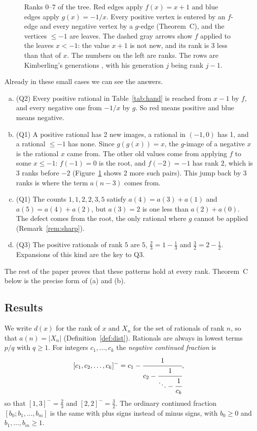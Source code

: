 \documentclass[11pt]{article}
\theoremstyle{definition}
\theoremstyle{remark}
\newcommand{\hj}[1]{[#1]^{-}}                 %
\begin{document}
\begin{figure}[t]
\centering
\resizebox{0.88\textwidth}{!}{}
\caption{Ranks $0$--$7$ of the tree. \textcolor{fred}{Red} edges apply $f(x)=x+1$ and
\textcolor{gblue}{blue} edges apply $g(x)=-1/x$. Every positive vertex is entered by an $f$-edge
and every negative vertex by a $g$-edge (Theorem~C), and the vertices $\le-1$ are leaves. The
dashed gray arrows show $f$ applied to the leaves $x<-1$: the value $x+1$ is not new, and its rank
is $3$ less than that of $x$. The numbers on the left are ranks. The rows are Kimberling's
generations \cite{oeisA226247}, with his generation $j$ being rank $j-1$.}
\label{fig:tree}
\end{figure}

Already in these small cases we can see the answers.
\begin{enumerate}[(a),itemsep=1pt,topsep=3pt]
\item (Q2) Every positive rational in Table~\ref{tab:hand} is reached from $x-1$ by $f$, and every
negative one from $-1/x$ by $g$. So red means positive and blue means negative.
\item (Q1) A positive rational has 2 new images, a rational in $(-1,0)$ has 1, and a rational
$\le-1$ has none. Since $g(g(x))=x$, the $g$-image of a negative $x$ is the rational $x$ came from.
The other old values come from applying $f$ to some $x\le-1$: $f(-1)=0$ is the root, and
$f(-2)=-1$ has rank $2$, which is $3$ ranks before $-2$ (Figure~\ref{fig:tree} shows 2 more such
pairs). This jump back by $3$ ranks is where the term $a(n-3)$ comes from.
\item (Q1) The counts $1,1,2,2,3,5$ satisfy $a(4)=a(3)+a(1)$ and $a(5)=a(4)+a(2)$, but $a(3)=2$ is
one less than $a(2)+a(0)$. The defect comes from the root, the only rational where $g$ cannot be
applied (Remark~\ref{rem:sharp}).
\item (Q3) The positive rationals of rank $5$ are $5$, $\tfrac23=1-\tfrac13$ and
$\tfrac32=2-\tfrac12$. Expansions of this kind are the key to Q3.
\end{enumerate}
The rest of the paper proves that these patterns hold at every rank. Theorem~C below is the
precise form of (a) and (b).

\subsection{Results}

We write $d(x)$ for the rank of $x$ and $X_n$ for the set of rationals of rank $n$, so that
$a(n)=|X_n|$ (Definition~\ref{def:dist}). Rationals are always in lowest terms $p/q$ with $q\ge1$.
For integers $c_1,\dots,c_k$ the \emph{negative continued fraction} is
\[
\hj{c_1,c_2,\dots,c_k}=c_1-\cfrac{1}{c_2-\cfrac{1}{\ddots-\cfrac{1}{c_k}}},
\]
so that $\hj{1,3}=\tfrac23$ and $\hj{2,2}=\tfrac32$. The ordinary continued fraction
$[b_0;b_1,\dots,b_m]$ is the same with plus signs instead of minus signs, with $b_0\ge0$ and
$b_1,\dots,b_m\ge1$.
\end{document}
